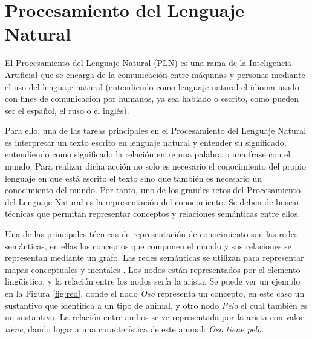 \section{Procesamiento del Lenguaje Natural}
\label{cap:sec:lenguajenatural}
El Procesamiento del Lenguaje Natural (PLN) es una rama de la Inteligencia Artificial que se encarga de la comunicación entre máquinas y personas mediante el uso del lenguaje natural (entendiendo como lenguaje natural el idioma usado con fines de comunicación por humanos, ya sea hablado o escrito, como pueden ser el español, el ruso o el inglés). 

Para ello, una de las tareas principales en el Procesamiento del Lenguaje Natural es interpretar un texto escrito en lenguaje natural y entender su significado, entendiendo como significado la relación entre una palabra o una frase con el mundo. Para realizar dicha acción no solo es necesario el conocimiento del propio lenguaje en que está escrito el texto sino que también es necesario un conocimiento del mundo. Por tanto, uno de los grandes retos del Procesamiento del Lenguaje Natural es la representación del conocimiento. Se deben de buscar técnicas que permitan representar conceptos y relaciones semánticas entre ellos. 

Una de las principales técnicas de representación de conocimiento son las redes semánticas, en ellas los conceptos que componen el mundo y sus relaciones se representan mediante un grafo. Las redes semánticas se utilizan para representar mapas conceptuales y mentales \citep{redSemantica2018}.
Los nodos están representados por el elemento lingüístico, y la relación entre los nodos sería la arista. Se puede ver un ejemplo en la Figura \ref{fig:red}, donde el nodo \textit{Oso} representa un concepto, en este caso un sustantivo que identifica a un tipo de animal, y otro nodo \textit{Pelo} el cual también es un sustantivo. La relación entre ambos se ve representada por la arista con valor \textit{tiene}, dando lugar a una característica de este animal: \textit{Oso tiene pelo}.
 

